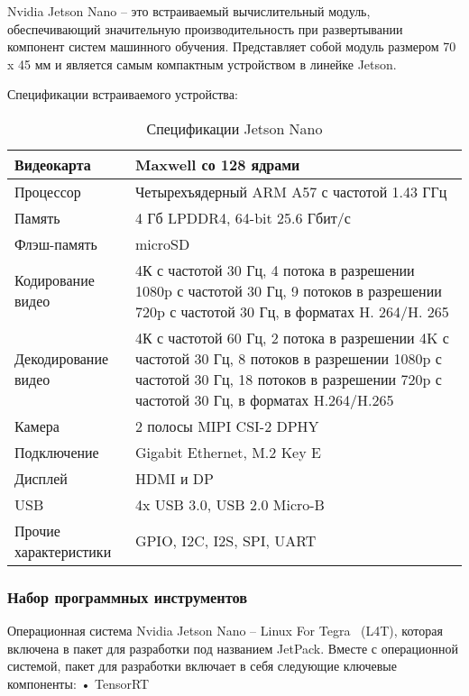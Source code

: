 Nvidia Jetson Nano – это встраиваемый вычислительный модуль, обеспечивающий значительную производительность при развертывании компонент систем машинного обучения.  Представляет собой модуль размером 70 x 45 мм и является самым компактным устройством в линейке Jetson.

Спецификации встраиваемого устройства:

\begin{table}[H]
	\caption{Спецификации Jetson Nano}
	\begin{center}
		\begin{tabular}{|l|l|}
			\hline
			Видеокарта & Maxwell со 128 ядрами \\ \hline
			Процессор & Четырехъядерный ARM A57 с частотой 1.43 ГГц \\ \hline
			Память & 4 Гб LPDDR4, 64-bit 25.6 Гбит/с \\ \hline
			Флэш-память & microSD \\ \hline
			Кодирование видео & 4К с частотой 30 Гц, 4 потока в разрешении 1080p с частотой 30 Гц, 9 потоков в разрешении 720p с частотой 30 Гц, в форматах H. 264/H. 265 \\ \hline
			Декодирование видео & 4К с частотой 60 Гц, 2 потока в разрешении 4K с частотой 30 Гц, 8 потоков в разрешении 1080p с частотой 30 Гц, 18 потоков в разрешении 720p с частотой 30 Гц, в форматах H.264/H.265 \\ \hline
			Камера & 2 полосы MIPI CSI-2 DPHY \\ \hline
			Подключение & Gigabit Ethernet, M.2 Key E \\ \hline
			Дисплей & HDMI и DP \\ \hline
			USB & 4x USB 3.0, USB 2.0 Micro-B \\ \hline
			Прочие характеристики & GPIO, I2C, I2S, SPI, UART \\ \hline
		\end{tabular}
		\label{tabular:tab_examp}
	\end{center}
\end{table}

\subsubsection{Набор программных инструментов}

Операционная система Nvidia Jetson Nano – Linux For Tegra ~(L4T), которая включена в пакет для разработки под названием JetPack. Вместе с операционной системой, пакет для разработки включает в себя следующие ключевые компоненты:
•	TensorRT


